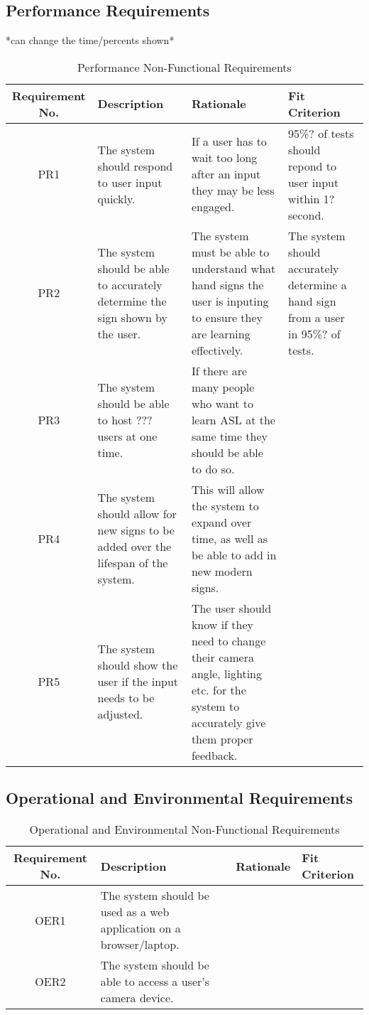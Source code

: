 \documentclass[12pt, titlepage]{article}
\begin{document}
\subsection{Performance Requirements}

*can change the time/percents shown* \\ 

\begin{table}[H]
\caption{Performance Non-Functional Requirements}
\noindent \begin{tabular}{| c | p{3cm}| p{3cm}| p{3cm}|}
\toprule 
\textbf{Requirement No.} & \textbf{Description} & \textbf{Rationale} & \textbf{Fit Criterion}\\
\midrule
PR1 & The system should respond to user input quickly. & If a user has to wait too long after an input they may be less engaged. & 95\%? of tests should repond to user input within 1? second. \\
\hline
PR2 & The system should be able to accurately determine the sign shown by the user. & The system must be able to understand what hand signs the user is inputing to ensure they are learning effectively. & The system should accurately determine a hand sign from a user in 95\%? of tests. \\
\hline
PR3 & The system should be able to host ??? users at one time. & If there are many people who want to learn ASL at the same time they should be able to do so. & \\
\hline
PR4 & The system should allow for new signs to be added over the lifespan of the system. & This will allow the system to expand over time, as well as be able to add in new modern signs. & \\
\hline
PR5 & The system should show the user if the input needs to be adjusted. & The user should know if they need to change their camera angle, lighting etc. for the system to accurately give them proper feedback. & \\
\bottomrule
\end{tabular}
\end{table}

\subsection{Operational and Environmental Requirements}

\begin{table}[H]
\caption{Operational and Environmental Non-Functional Requirements}
\noindent \begin{tabular}{| c | p{3cm}| p{3cm}| p{3cm}|}
\toprule 
\textbf{Requirement No.} & \textbf{Description} & \textbf{Rationale} & \textbf{Fit Criterion}\\
\midrule
OER1 & The system should be used as a web application on a browser/laptop. & & \\
\hline
OER2 & The system should be able to access a user's camera device. & & \\
\bottomrule
\end{tabular}
\end{table}
\end{document}
